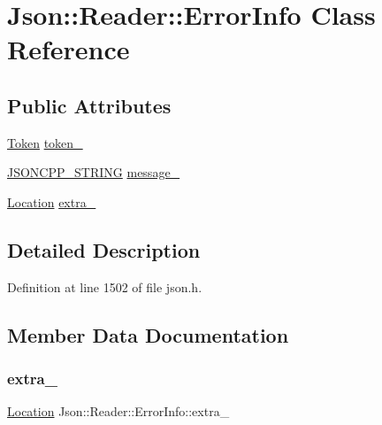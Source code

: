 \hypertarget{class_json_1_1_reader_1_1_error_info}{}\section{Json\+:\+:Reader\+:\+:Error\+Info Class Reference}
\label{class_json_1_1_reader_1_1_error_info}
\subsection*{Public Attributes}
\begin{DoxyCompactItemize}
\item 
\hyperlink{class_json_1_1_reader_1_1_token}{Token} \hyperlink{class_json_1_1_reader_1_1_error_info_a52e1c71b12eb1c3f0395d7ef1e778ce6}{token\+\_\+}
\item 
\hyperlink{config_8h_a1e723f95759de062585bc4a8fd3fa4be}{J\+S\+O\+N\+C\+P\+P\+\_\+\+S\+T\+R\+I\+NG} \hyperlink{class_json_1_1_reader_1_1_error_info_a3529d420f7c83165565bf294a5d6ed13}{message\+\_\+}
\item 
\hyperlink{class_json_1_1_reader_a46795b5b272bf79a7730e406cb96375a}{Location} \hyperlink{class_json_1_1_reader_1_1_error_info_af92c24acf642b040d6e40aac4952d44d}{extra\+\_\+}
\end{DoxyCompactItemize}


\subsection{Detailed Description}


Definition at line 1502 of file json.\+h.



\subsection{Member Data Documentation}
\hypertarget{class_json_1_1_reader_1_1_error_info_af92c24acf642b040d6e40aac4952d44d}{}\label{class_json_1_1_reader_1_1_error_info_af92c24acf642b040d6e40aac4952d44d} 
\subsubsection{\texorpdfstring{extra\+\_\+}{extra\_}}
{\footnotesize\ttfamily \hyperlink{class_json_1_1_reader_a46795b5b272bf79a7730e406cb96375a}{Location} Json\+::\+Reader\+::\+Error\+Info\+::extra\+\_\+}



